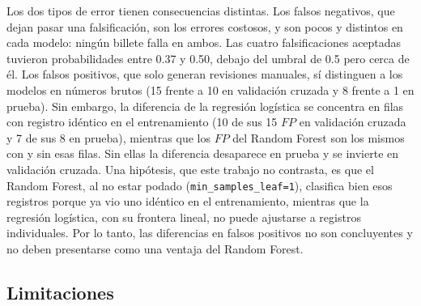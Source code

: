 \documentclass[conference]{IEEEtran}
\begin{document}
	Los dos tipos de error tienen consecuencias distintas. Los falsos negativos, que dejan pasar una falsificación, son los errores costosos, y son pocos y distintos en cada modelo: ningún billete falla en ambos. Las cuatro falsificaciones aceptadas tuvieron probabilidades entre 0.37 y 0.50, debajo del umbral de 0.5 pero cerca de él. Los falsos positivos, que solo generan revisiones manuales, sí distinguen a los modelos en números brutos (15 frente a 10 en validación cruzada y 8 frente a 1 en prueba). Sin embargo, la diferencia de la regresión logística se concentra en filas con registro idéntico en el entrenamiento (10 de sus 15 $FP$ en validación cruzada y 7 de sus 8 en prueba), mientras que los $FP$ del Random Forest son los mismos con y sin esas filas. Sin ellas la diferencia desaparece en prueba y se invierte en validación cruzada. Una hipótesis, que este trabajo no contrasta, es que el Random Forest, al no estar podado (\texttt{min\_samples\_leaf=1}), clasifica bien esos registros porque ya vio uno idéntico en el entrenamiento, mientras que la regresión logística, con su frontera lineal, no puede ajustarse a registros individuales. Por lo tanto, las diferencias en falsos positivos no son concluyentes y no deben presentarse como una ventaja del Random Forest.
	
	\subsection{Limitaciones}
	
\end{document}
